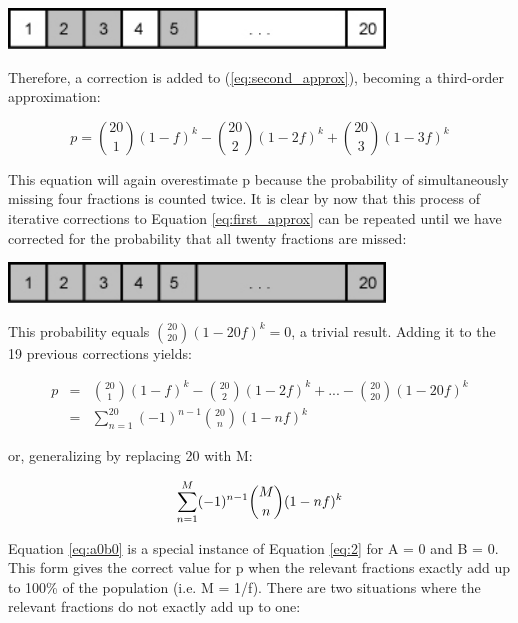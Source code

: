 \documentclass[12]{article}
\begin{document}
\begin{minipage}[c]{\textwidth}
  \begin{center}
  \includegraphics[width=10cm]{A8.jpg}  
  \end{center}

Therefore, a correction is added to (\ref{eq:second_approx}), becoming
a third-order approximation:

\begin{equation}
  \label{eq:third_approx}
  p  = \binom{20}{1}(1-f)^k - \binom{20}{2}(1-2f)^k + \binom{20}{3}(1-3f)^k
\end{equation}

This  equation will again  overestimate p  because the  probability of
simultaneously missing  four fractions is counted twice.   It is clear
by  now  that  this  process  of  iterative  corrections  to  Equation
\ref{eq:first_approx} can be repeated  until we have corrected for the
probability that all twenty fractions are missed:

\end{minipage}

\begin{minipage}[c]{\textwidth}

  \begin{center}
  \includegraphics[width=10cm]{A9.jpg}  
  \end{center}

This probability equals $\binom{20}{20}(1-20f)^k = 0$, a trivial result.
Adding it to the 19 previous corrections yields:

\begin{eqnarray}
  p  & = & \binom{20}{1}(1-f)^k - \binom{20}{2}(1-2f)^k + ... 
           - \binom{20}{20}(1-20f)^k\\
  ~  & = & \sum_{n=1}^{20}(-1)^{n-1} \binom{20}{n}  (1-nf)^k
  \label{eq:twentieth_approx}
\end{eqnarray}

or, generalizing by replacing 20 with M:

\begin{equation}
  \label{eq:a0b0}
\sum_{n=1}^{M}(-1)^{n-1} \binom{M}{n}  (1-nf)^k\\
\end{equation}

Equation \ref{eq:a0b0}  is a  special instance of  Equation \ref{eq:2}
for A = 0 and B = 0.  This form gives the correct value for p when the
relevant fractions exactly add up  to 100\% of the population (i.e.  M
= 1/f).  There are two  situations where the relevant fractions do not
exactly add up to one:

\end{minipage}
\end{document}
